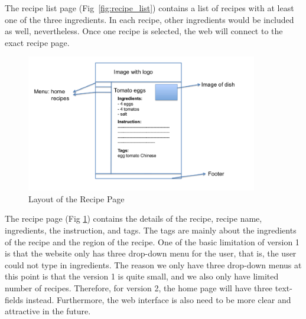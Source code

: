 The recipe list page (Fig~\ref{fig:recipe_list}) contains a list of recipes with at least one of the three ingredients. In each recipe, other ingredients would be included as well, nevertheless. Once one recipe is selected, the web will connect to the exact recipe page.

\begin{figure}
\includegraphics[width=0.9\textwidth]{recipe_page}
\caption{Layout of the Recipe Page}
\label{fig:recipe_page}
\end{figure}

The recipe page (Fig \ref{fig:recipe_page}) contains the details of the recipe, recipe name, ingredients, the instruction, and tags. The tags are mainly about the ingredients of the recipe and the region of the recipe.
One of the basic limitation of version 1 is that the website only has three drop-down menu for the user, that is, the user could not type in ingredients. The reason we only have three drop-down menus at this point is that the version 1 is quite small, and we also only have limited number of recipes. Therefore, for version 2, the home page will have three text-fields instead. Furthermore, the web interface is also need to be more clear and attractive in the future.

